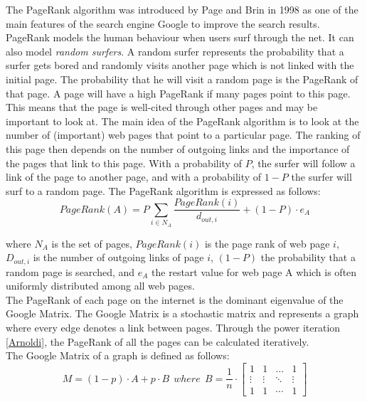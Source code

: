  

The PageRank algorithm was introduced by Page and Brin in 1998 as one of the main features of the search engine Google to improve the search results. PageRank models the human behaviour when users surf through the net. It can also model \textit{random surfers}. A random surfer represents the probability that a surfer gets bored and randomly visits another page which is not linked with the initial page. The probability that he will visit a random page is the PageRank of that page. A page will have a high PageRank if many pages point to this page. This means that the page is well-cited through other pages and may be important to look at. The main idea of the PageRank algorithm is to look at the number of (important) web pages that point to a particular page. The ranking of this page then depends on the number of outgoing links and the importance of the pages that link to this page. With a probability of $P$, the surfer will follow a link of the page to another page, and with a probability of $1-P$ the surfer will surf to a random page. The PageRank algorithm is expressed as follows:
\begin{equation}
PageRank(A)=P \sum \limits_{i \in N_{A}} \dfrac{PageRank(i)}{d_{out,i}} + (1-P) \cdot e_{A}
\end{equation}

where $N_{A}$ is the set of pages, $PageRank(i)$ is the page rank of web page $i$, $D_{out,i}$ is the number of outgoing links of page $i$, $(1-P)$ the probability that a random page is searched, and $e_{A}$ the restart value for web page A which is often uniformly distributed among all web pages. \\

The PageRank of each page on the internet is the dominant eigenvalue of the Google Matrix. The Google Matrix is a stochastic matrix and represents a graph where every edge denotes a link between pages. Through the power iteration  \ref{Arnoldi}, the PageRank of all the pages can be calculated iteratively. \\

The Google Matrix of a graph is defined as follows:
\begin{equation}
M = (1-p) \cdot A + p \cdot B ~~where~~B=\dfrac{1}{n}\cdot \begin{bmatrix}
       1 & 1 & \ldots &1           \\[0.3em]
       \vdots & \vdots          & \ddots & \vdots \\[0.3em]
       1 & 1& \cdots &1
     \end{bmatrix}
\end{equation}


